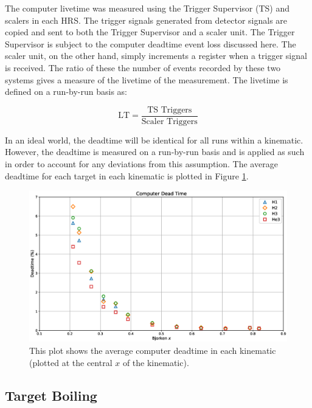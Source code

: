 The computer livetime was measured using the Trigger Supervisor (TS) and scalers in each HRS. The trigger signals generated from detector signals are copied and sent to both the Trigger Supervisor and a scaler unit. The Trigger Supervisor is subject to the computer deadtime event loss discussed here. The scaler unit, on the other hand, simply increments a register when a trigger signal is received. The ratio of these the number of events recorded by these two systems gives a measure of the livetime of the measurement. The livetime is defined on a run-by-run basis as:


\begin{equation}
\text{LT} = \frac{\text{TS Triggers}}{\text{Scaler Triggers}}
\end{equation}

In an ideal world, the deadtime will be identical for all runs within a kinematic. However, the deadtime is measured on a run-by-run basis and is applied as such in order to account for any deviations from this assumption. The average deadtime for each target in each kinematic is plotted in Figure \ref{fig:deadtime}.

\begin{figure}
	\includegraphics[width=\textwidth]{./analysis/fig/deadtime.eps}
	\caption{This plot shows the average computer deadtime in each kinematic (plotted at the central $x$ of the kinematic).}
	\label{fig:deadtime}
\end{figure}

\subsection{Target Boiling}
\label{sec:boiling}

